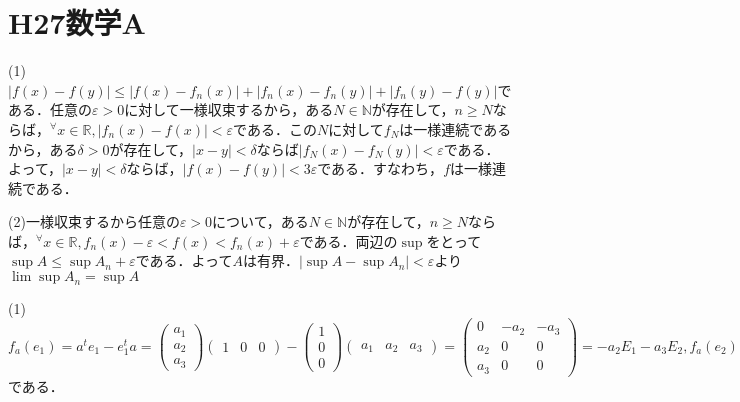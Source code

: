 \documentclass[
		book,
		head_space=20mm,
		foot_space=20mm,
		gutter=10mm,
		line_length=190mm
]{jlreq}
\begin{document}
\section{H27数学A}
(1)$|f(x)-f(y)|\le |f(x)-f_n(x)|+|f_n(x)-f_n(y)|+|f_n(y)-f(y)|$である．任意の$\varepsilon>0$に対して一様収束するから，ある$N\in \mathbb{N}$が存在して，$n\ge N$ならば，$^\forall x \in \mathbb{R},|f_n(x)-f(x)|<\varepsilon$である．この$N$に対して$f_N$は一様連続であるから，ある$\delta>0$が存在して，$|x-y|<\delta$ならば$|f_N(x)-f_N(y)|<\varepsilon$である．よって，$|x-y|<\delta$ならば，$|f(x)-f(y)|<3\varepsilon$である．すなわち，$f$は一様連続である．

(2)一様収束するから任意の$\varepsilon>0$について，ある$N\in \mathbb{N}$が存在して，$n\ge N$ならば，$^\forall x \in \mathbb{R},f_n(x)-\varepsilon<f(x)<f_n(x)+\varepsilon$である．両辺の$\sup$をとって$\sup A \le \sup A_n +\varepsilon$である．よって$A$は有界．$|\sup A-\sup A_n|<\varepsilon$より$\lim \sup A_n=\sup A$

(1)$f_a(e_1)=a^t\!e_1-e_1^t\!a=\begin{pmatrix}
a_1\\
a_2\\
a_3
\end{pmatrix}\begin{pmatrix}
1 & 0 & 0
\end{pmatrix}-\begin{pmatrix}
1\\
0\\
0
\end{pmatrix}\begin{pmatrix}
a_1 & a_2 & a_3
\end{pmatrix}=\begin{pmatrix}
	0 & -a_2 & -a_3\\
	a_2 & 0 & 0\\
	a_3 & 0 & 0
\end{pmatrix}=-a_2E_1-a_3E_2,
f_a(e_2)=\begin{pmatrix}
0 & a_1 & 0\\
-a_1 & 0 & -a_3\\
0 & a_3 & 0
\end{pmatrix}=a_1E_1-a_3E_3,
f_a(e_3)=\begin{pmatrix}
0 & 0 & a_1\\
0 & 0 & a_2\\
-a_1 & -a_2 & 0
\end{pmatrix}=a_1E_2+a_2E_3$である．
\end{document}
